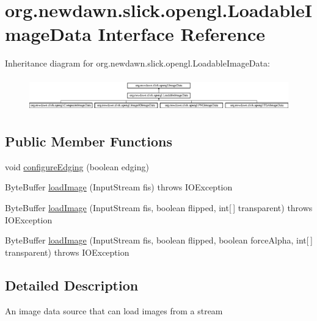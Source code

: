 \hypertarget{interfaceorg_1_1newdawn_1_1slick_1_1opengl_1_1_loadable_image_data}{}\section{org.\+newdawn.\+slick.\+opengl.\+Loadable\+Image\+Data Interface Reference}
\label{interfaceorg_1_1newdawn_1_1slick_1_1opengl_1_1_loadable_image_data}
Inheritance diagram for org.\+newdawn.\+slick.\+opengl.\+Loadable\+Image\+Data\+:\begin{figure}[H]
\begin{center}
\leavevmode
\includegraphics[height=1.458333cm]{interfaceorg_1_1newdawn_1_1slick_1_1opengl_1_1_loadable_image_data}
\end{center}
\end{figure}
\subsection*{Public Member Functions}
\begin{DoxyCompactItemize}
\item 
void \mbox{\hyperlink{interfaceorg_1_1newdawn_1_1slick_1_1opengl_1_1_loadable_image_data_a1f9fb94bae3936761535408ba7afc0df}{configure\+Edging}} (boolean edging)
\item 
Byte\+Buffer \mbox{\hyperlink{interfaceorg_1_1newdawn_1_1slick_1_1opengl_1_1_loadable_image_data_a640021b955dde7deeeeabb5ac3738d2b}{load\+Image}} (Input\+Stream fis)  throws I\+O\+Exception
\item 
Byte\+Buffer \mbox{\hyperlink{interfaceorg_1_1newdawn_1_1slick_1_1opengl_1_1_loadable_image_data_a448a235d1058316349f513a69f593d9b}{load\+Image}} (Input\+Stream fis, boolean flipped, int\mbox{[}$\,$\mbox{]} transparent)  throws I\+O\+Exception
\item 
Byte\+Buffer \mbox{\hyperlink{interfaceorg_1_1newdawn_1_1slick_1_1opengl_1_1_loadable_image_data_ae1be205b86c674550235e9f357adadf5}{load\+Image}} (Input\+Stream fis, boolean flipped, boolean force\+Alpha, int\mbox{[}$\,$\mbox{]} transparent)  throws I\+O\+Exception
\end{DoxyCompactItemize}


\subsection{Detailed Description}
An image data source that can load images from a stream

